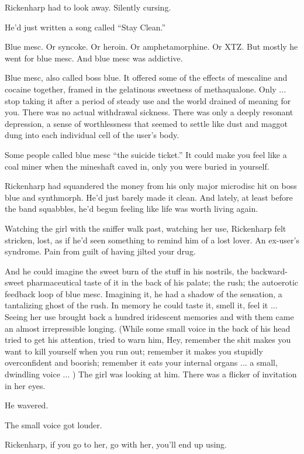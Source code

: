Rickenharp had to look away. Silently cursing.

He'd just written a song called ``Stay Clean.''

Blue mesc. Or syncoke. Or heroin. Or amphetamorphine. Or XTZ. But mostly he went for blue mesc. And blue mesc was addictive.

Blue mesc, also called boss blue. It offered some of the effects of mescaline and cocaine together, framed in the gelatinous sweetness of methaqualone. Only ... stop taking it after a period of steady use and the world drained of meaning for you. There was no actual withdrawal sickness. There was only a deeply resonant depression, a sense of worthlessness that seemed to settle like dust and maggot dung into each individual cell of the user's body.

Some people called blue mesc ``the suicide ticket.'' It could make you feel like a coal miner when the mineshaft caved in, only you were buried in yourself.

Rickenharp had squandered the money from his only major microdisc hit on boss blue and synthmorph. He'd just barely made it clean. And lately, at least before the band squabbles, he'd begun feeling like life was worth living again.

Watching the girl with the sniffer walk past, watching her use, Rickenharp felt stricken, lost, as if he'd seen something to remind him of a lost lover. An ex-user's syndrome. Pain from guilt of having jilted your drug.

And he could imagine the sweet burn of the stuff in his nostrils, the backward-sweet pharmaceutical taste of it in the back of his palate; the rush; the autoerotic feedback loop of blue mesc. Imagining it, he had a shadow of the sensation, a tantalizing ghost of the rush. In memory he could taste it, smell it, feel it ... Seeing her use brought back a hundred iridescent memories and with them came an almost irrepressible longing. (While some small voice in the back of his head tried to get his attention, tried to warn him, Hey, remember the shit makes you want to kill yourself when you run out; remember it makes you stupidly overconfident and boorish; remember it eats your internal organs ... a small, dwindling voice ... ) The girl was looking at him. There was a flicker of invitation in her eyes.

He wavered.

The small voice got louder.

Rickenharp, if you go to her, go with her, you'll end up using.

